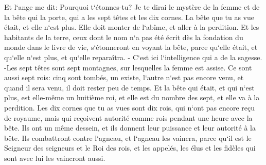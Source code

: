 \verse Et l`ange me dit: Pourquoi t`étonnes-tu? Je te dirai le mystère de la femme et de la bête qui la porte, qui a les sept têtes et les dix cornes. 
\verse La bête que tu as vue était, et elle n`est plus. Elle doit monter de l`abîme, et aller à la perdition. Et les habitants de la terre, ceux dont le nom n`a pas été écrit dès la fondation du monde dans le livre de vie, s`étonneront en voyant la bête, parce qu`elle était, et qu`elle n`est plus, et qu`elle reparaîtra. - 
\verse C`est ici l`intelligence qui a de la sagesse. -Les sept têtes sont sept montagnes, sur lesquelles la femme est assise. 
\verse Ce sont aussi sept rois: cinq sont tombés, un existe, l`autre n`est pas encore venu, et quand il sera venu, il doit rester peu de temps. 
\verse Et la bête qui était, et qui n`est plus, est elle-même un huitième roi, et elle est du nombre des sept, et elle va à la perdition. 
\verse Les dix cornes que tu as vues sont dix rois, qui n`ont pas encore reçu de royaume, mais qui reçoivent autorité comme rois pendant une heure avec la bête. 
\verse Ils ont un même dessein, et ils donnent leur puissance et leur autorité à la bête. 
\verse Ils combattront contre l`agneau, et l`agneau les vaincra, parce qu`il est le Seigneur des seigneurs et le Roi des rois, et les appelés, les élus et les fidèles qui sont avec lui les vaincront aussi. 

